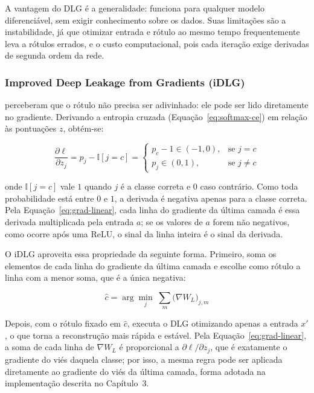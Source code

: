 A vantagem do DLG é a generalidade: funciona para qualquer modelo diferenciável, sem exigir conhecimento sobre os dados. Suas limitações são a instabilidade, já que otimizar entrada e rótulo ao mesmo tempo frequentemente leva a rótulos errados, e o custo computacional, pois cada iteração exige derivadas de segunda ordem da rede.

\subsubsection{Improved Deep Leakage from Gradients (iDLG)} \label{sec:idlg}

 perceberam que o rótulo não precisa ser adivinhado: ele pode ser lido diretamente no gradiente. Derivando a entropia cruzada (Equação~\ref{eq:softmax-ce}) em relação às pontuações $z$, obtém-se:

\begin{equation} \label{eq:grad-logit}
\frac{\partial \ell}{\partial z_j} = p_j - \mathbb{I}[j = c] =
\begin{cases}
p_c - 1 \in (-1, 0), & \text{se } j = c \\
p_j \in (0, 1), & \text{se } j \neq c
\end{cases}
\end{equation}

\noindent onde $\mathbb{I}[j = c]$ vale $1$ quando $j$ é a classe correta e $0$ caso contrário. Como toda probabilidade está entre $0$ e $1$, a derivada é negativa apenas para a classe correta. Pela Equação~\ref{eq:grad-linear}, cada linha do gradiente da última camada é essa derivada multiplicada pela entrada $a$; se os valores de $a$ forem não negativos, como ocorre após uma ReLU, o sinal da linha inteira é o sinal da derivada.

O iDLG aproveita essa propriedade da seguinte forma. Primeiro, soma os elementos de cada linha do gradiente da última camada e escolhe como rótulo a linha com a menor soma, que é a única negativa:

\begin{equation} \label{eq:idlg-label}
\hat{c} = \arg\min_{j} \; \sum_{m} \big(\nabla W_{L}\big)_{j,m}
\end{equation}

\noindent Depois, com o rótulo fixado em $\hat{c}$, executa o DLG otimizando apenas a entrada $x'$, o que torna a reconstrução mais rápida e estável. Pela Equação~\ref{eq:grad-linear}, a soma de cada linha de $\nabla W_L$ é proporcional a $\partial \ell / \partial z_j$, que é exatamente o gradiente do viés daquela classe; por isso, a mesma regra pode ser aplicada diretamente ao gradiente do viés da última camada, forma adotada na implementação descrita no Capítulo~3.

